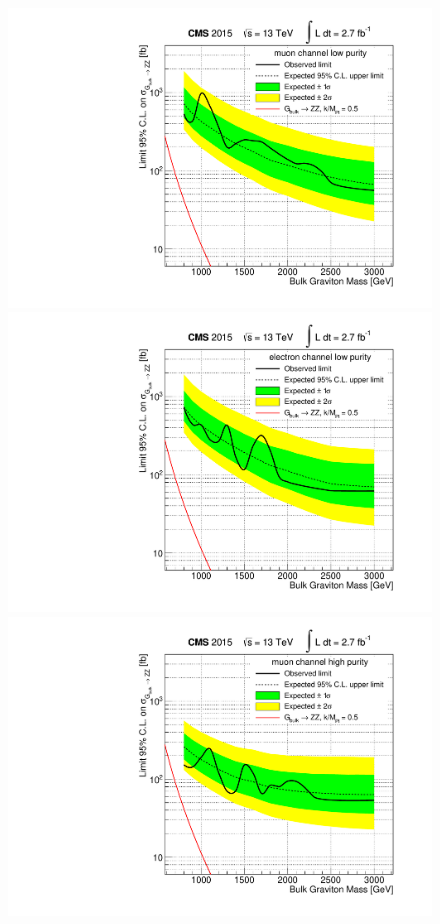 \begin{figure}[h]
\centering
\includegraphics[scale=0.37]{figures/limits/limitMLP.pdf}
\includegraphics[scale=0.37]{figures/limits/limitELP.pdf}\\[1cm]
\includegraphics[scale=0.37]{figures/limits/limitMHP.pdf}

\end{figure}
